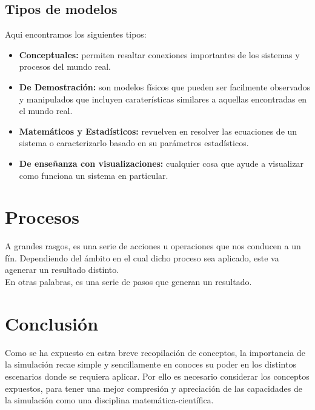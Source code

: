 \documentclass[letterpaper, 12pt]{article}
\begin{document}
\begin{justify}
        \subsection*{Tipos de modelos}
        \justify
        Aqui encontramos los siguientes tipos:
        \begin{itemize}
            \item \textbf{Conceptuales:} permiten resaltar conexiones importantes de los sistemas y procesos del mundo real.
            \item \textbf{De Demostración:} son modelos físicos que pueden ser facilmente observados y manipulados que incluyen caraterísticas similares a aquellas encontradas en el mundo real.
            \item \textbf{Matemáticos y Estadísticos:} revuelven en resolver las ecuaciones de un sistema o caracterizarlo basado en su parámetros estadísticos.
            \item \textbf{De enseñanza con visualizaciones:} cualquier cosa que ayude a visualizar como funciona un sistema en particular.
        \end{itemize}
        \section*{Procesos}
        \justify
        A grandes rasgos, es una serie de acciones u operaciones que nos conducen a un fín. Dependiendo del ámbito en el cual dicho proceso sea aplicado, este va agenerar un resultado distinto.
        \\\newline
        En otras palabras, es una serie de pasos que generan un resultado.
        \section*{Conclusión}
        \justify
        Como se ha expuesto en estra breve recopilación de conceptos, la importancia de la simulación recae simple y sencillamente en conoces su poder en los distintos escenarios donde se requiera aplicar. Por
        ello es necesario considerar los conceptos expuestos, para tener una mejor compresión y apreciación de las capacidades de la simulación como una disciplina matemática-científica. 

    \end{justify}

    \newpage
        \thispagestyle{empty}
        \printbibliography
\end{document}
